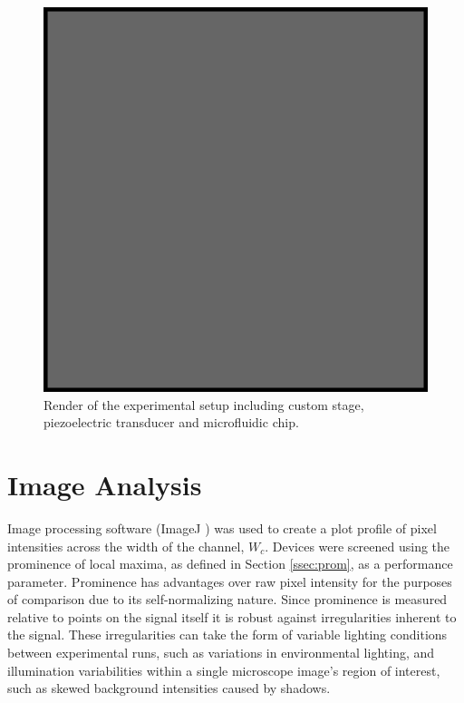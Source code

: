 \begin{figure}[htb]
  \begin{minipage}[t]{0.99\linewidth}\centering
    \includegraphics[width=12cm]{example}
  \end{minipage}\hfill
	\caption{Render of the experimental setup including custom stage, piezoelectric transducer and microfluidic chip.}
	\label{fig:setup}
\end{figure}

\section{Image Analysis}
\label{sec:img}
Image processing software (ImageJ \cite{imagej}) was used to create a plot profile of pixel intensities across the width of the channel, $W_c$. Devices were screened using the prominence of local maxima, as defined in Section \ref{ssec:prom}, as a performance parameter. Prominence has advantages over raw pixel intensity for the purposes of comparison due to its self-normalizing nature. Since prominence is measured relative to points on the signal itself it is robust against irregularities inherent to the signal. These irregularities can take the form of variable lighting conditions between experimental runs, such as variations in environmental lighting, and illumination variabilities within a single microscope image's region of interest, such as skewed background intensities caused by shadows. 

